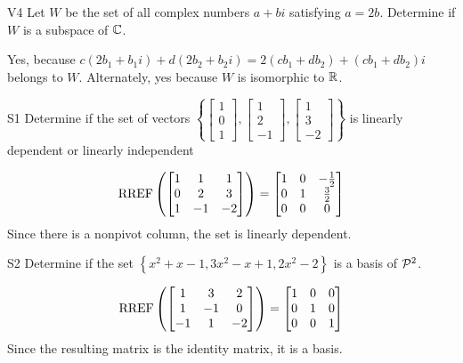 \documentclass{sbgLAsemi}
\begin{document}
\begin{problem}{V4} Let \(W\) be the set of all complex numbers \(a+bi\)
satisfying  \(a=2b\).
Determine if \(W\) is a subspace of \(\IC\).
\end{problem}
\begin{solution}
Yes, because \(c(2b_1+b_1i)+d(2b_2+b_2i)=2(cb_1+db_2)+(cb_1+db_2)i\) belongs to
\(W\). Alternately, yes because \(W\) is isomorphic to \(\IR\).
\end{solution}
\begin{problem}{S1}
Determine if the set of vectors  $\left\{\begin{bmatrix} 1 \\ 0 \\ 1 \end{bmatrix}, \begin{bmatrix} 1 \\ 2 \\ -1 \end{bmatrix}, \begin{bmatrix} 1 \\ 3 \\ -2 \end{bmatrix}\right\}$ is  linearly dependent or linearly independent
\end{problem}
\begin{solution}
$$\RREF\left( \begin{bmatrix} 1 &  1 & 1 \\ 0  & 2 & 3 \\ 1  & -1 & -2 \end{bmatrix} \right) = \begin{bmatrix} 1 &  0 & -\frac{1}{2} \\ 0  & 1 & \frac{3}{2} \\ 0& 0 & 0  \end{bmatrix}$$
Since there is a nonpivot column, the set is linearly dependent.
\end{solution}

\begin{problem}{S2}
Determine if the set $\left\{ x^2+x-1, 3x^2-x+1, 2x^2-2 \right\}$ is a basis of $\P^2$.
\end{problem}
\begin{solution}
$$\RREF\left(\begin{bmatrix} 1 & 3 & 2 \\ 1 & -1 & 0 \\ -1 & 1 & -2 \end{bmatrix} \right)= \begin{bmatrix} 1 & 0 &0 \\ 0 & 1 & 0 \\ 0 & 0 & 1\end{bmatrix}$$
Since the resulting matrix is the identity matrix, it is a basis.
\end{solution}
\end{document}
